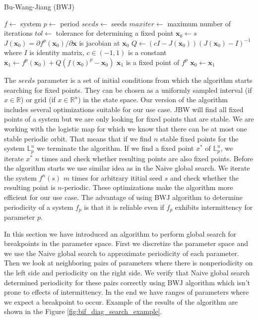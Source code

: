 \begin{algorithm}[!h]
    \caption{Bu-Wang-Jiang (BWJ)}
    \label{alg:bwj}
    \begin{algorithmic}[1]
        \Statex $f \gets$ system
        \Statex $p \gets$ period
        \Statex $seeds \gets$ seeds
        \Statex $maxiter \gets$ maximum number of iterations
        \Statex $tol \gets$ tolerance for determining a fixed point
            \State $\textbf{x}_{0} \gets s$
                \State $J(\textbf{x}_{0}) = \partial f^{p}(\textbf{x}_{0}) / \partial \textbf{x}$ is jacobian at $\textbf{x}_{0}$
                \State $Q \gets (cI-J(\textbf{x}_{0}))(J(\textbf{x}_{0})-I)^{-1}$ where $I$ is identity matrix, $c \in (-1, 1)$ is a constant 
                \State $\textbf{x}_1 \gets f^{p}(\textbf{x}_{0}) + Q(f(\textbf{x}_{0})^{p}-\textbf{x}_{0})$
                    \State $\textbf{x}_{1}$ is a fixed point of $f^{p}$
                \EndIf
                \State $\textbf{x}_{0} \gets \textbf{x}_{1}$
            \EndWhile
        \EndFor
    \end{algorithmic}
\end{algorithm}

The $seeds$ parameter is a set of initial conditions from which the algorithm starts searching for fixed points.
They can be chosen as a uniformly sampled interval (if $x \in \mathbb{R}$) or grid (if $x \in \mathbb{R}^{n}$) in the state space.
Our version of the algorithm includes several optimizations suitable for our use case.
JBW will find all fixed points of a system but we are only looking for fixed points that are stable.
We are working with the logistic map for which we know that there can be at most one stable periodic orbit.
That means that if we find $n$ stable fixed points for the system $\mathbb{L}_{p}^{n}$ we terminate the algorithm.
If we find a fixed point $x^{*}$ of $\mathbb{L}_{p}^{n}$, we iterate $x^{*}$ $n$ times and check whether resulting points are also fixed points.
Before the algorithm starts we use similar idea as in the Naive global search. We iterate the system $f^{n}(s)$ $m$ times for arbitrary ititial seed $s$ and check whether the resulting point is $n$-periodic.
These optimizations make the algorithm more efficient for our use case.
The advantage of using BWJ algorithm to determine periodicity of a system $f_{p}$ is that it is reliable even if $f_{p}$ exhibits intermittency for parameter $p$.
\par
In this section we have introduced an algorithm to perform global search for breakpoints in the parameter space.
First we discretize the parameter space and we use the Naive global search to approximate periodicity of each parameter.
Then we look at neighboring pairs of parameters where there is nonperiodicity on the left side and periodicity on the right side.
We verify that Naive global search determined periodicity for these pairs correctly using BWJ algorithm which isn't prone to effects of intermittency.
In the end we have ranges of parameters where we expect a breakpoint to occur.
Example of the results of the algorithm are shown in the Figure \ref{fig:bif_diag_search_example}.

